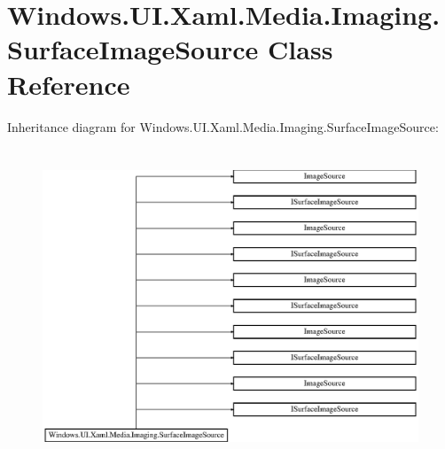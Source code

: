 \hypertarget{class_windows_1_1_u_i_1_1_xaml_1_1_media_1_1_imaging_1_1_surface_image_source}{}\section{Windows.\+U\+I.\+Xaml.\+Media.\+Imaging.\+Surface\+Image\+Source Class Reference}
\label{class_windows_1_1_u_i_1_1_xaml_1_1_media_1_1_imaging_1_1_surface_image_source}
Inheritance diagram for Windows.\+U\+I.\+Xaml.\+Media.\+Imaging.\+Surface\+Image\+Source\+:\begin{figure}[H]
\begin{center}
\leavevmode
\includegraphics[height=9.447853cm]{class_windows_1_1_u_i_1_1_xaml_1_1_media_1_1_imaging_1_1_surface_image_source}
\end{center}
\end{figure}
